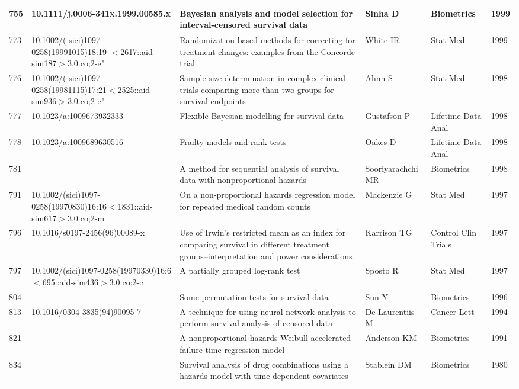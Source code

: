 \begin{landscape}
\begin{longtable}{|p{0.3in}|p{1.8in}|p{2.4in}|p{0.68in}|p{0.89in}|p{0.3in}|}
755 & 10.1111/j.0006-341x.1999.00585.x   & Bayesian analysis and model selection for interval-censored survival data & Sinha D & Biometrics & 1999 \\ \hline 
773 & 10.1002/(  sici)1097-0258(19991015)18:19 $\mathrm{<}$2617\-::aid-sim187$\mathrm{>}$3.0.co;2-e" & Randomization-based methods for correcting for treatment changes: examples from the Concorde trial & White IR & Stat Med & 1999 \\ \hline 
776 & 10.1002/( sici)1097-0258(19981115)17:21$\mathrm{<}$2525\-::aid-sim936$\mathrm{>}$3.0.co;2-e" & Sample size determination in complex clinical trials comparing more than two groups for survival endpoints & Ahnn S & Stat Med & 1998 \\ \hline 
777 & 10.1023/a:1009673932333    & Flexible Bayesian modelling for survival data & Gustafson P & Lifetime Data Anal & 1998 \\ \hline 
778 & 10.1023/a:1009689630516    & Frailty models and rank tests & Oakes D & Lifetime Data Anal & 1998 \\ \hline 
781 &  & A method for sequential analysis of survival data with nonproportional hazards & Soori\-yarachchi MR & Biometrics & 1998 \\ \hline 
791 & 10.1002/(sici)1097-0258(19970830)16:16$\mathrm{<}$1831\-::aid-sim617$\mathrm{>}$3.0.co;2-m & On a non-proportional hazards regression model for repeated medical random counts & Mackenzie G & Stat Med & 1997 \\ \hline 
796 & 10.1016/s0197-2456(96)00089-x   & Use of Irwin's restricted mean as an index for comparing survival in different treatment groups--interpretation and power considerations & Karrison TG & Control Clin Trials & 1997 \\ \hline 
797 & 10.1002/(sici)1097-0258(19970330)16:6$\mathrm{<}$695\-::aid-sim436$\mathrm{>}$3.0.co;2-c & A partially grouped log-rank test & Sposto R & Stat Med & 1997 \\ \hline 
804 &  & Some permutation tests for survival data & Sun Y & Biometrics & 1996 \\ \hline 
813 & 10.1016/0304-3835(94)90095-7   & A technique for using neural network analysis to perform survival analysis of censored data & De Laurentiis M & Cancer Lett & 1994 \\ \hline 
821 &  & A nonproportional hazards Weibull accelerated failure time regression model & Anderson KM & Biometrics & 1991 \\ \hline 
834 &  & Survival analysis of drug combinations using a hazards model with time-dependent covariates & Stablein DM & Biometrics & 1980 \\ \hline 

\end{longtable}
\end{landscape}
